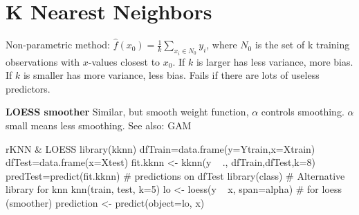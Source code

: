 \section*{K Nearest Neighbors}
Non-parametric method: $\hat f(x_0)= \tfrac{1}{k} \sum_{x_i\in N_0} y_i$, where $N_0$ is the set of k training observations with $x$-values closest to $x_0$.
If $k$ is larger has less variance, more bias. If $k$ is smaller has more variance, less bias.
Fails if there are lots of useless predictors.

\textbf{LOESS smoother}
Similar, but smooth weight function, $\alpha$ controls smoothing.
$\alpha$ small means less smoothing. See also: GAM

\begin{codebox}{r}{KNN \& LOESS}
   library(kknn)
   dfTrain=data.frame(y=Ytrain,x=Xtrain)
   dfTest=data.frame(x=Xtest)
   fit.kknn <- kknn(y ~ ., dfTrain,dfTest,k=8)
   predTest=predict(fit.kknn) # predictions on dfTest
   library(class) # Alternative library for knn
   knn(train, test, k=5)
   lo <- loess(y ~ x, span=alpha) # for loess (smoother)
   prediction <- predict(object=lo, x)
\end{codebox}
